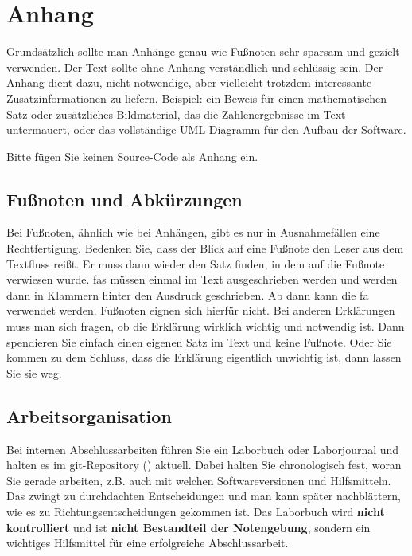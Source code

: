 
\appendix
\chapter{Anhang}
\label{anhang}

Grundsätzlich sollte man Anhänge genau wie Fußnoten sehr sparsam und gezielt verwenden.
Der Text sollte ohne Anhang verständlich und schlüssig sein.
Der Anhang dient dazu, nicht notwendige, aber vielleicht trotzdem interessante Zusatzinformationen zu liefern.
Beispiel: ein Beweis für einen mathematischen Satz oder zusätzliches Bildmaterial, das die Zahlenergebnisse im Text untermauert, oder das vollständige UML-Diagramm für den Aufbau der Software.

Bitte fügen Sie keinen Source-Code als Anhang ein.

\section{Fußnoten und Abkürzungen}

Bei Fußnoten, ähnlich wie bei Anhängen, gibt es nur in Ausnahmefällen eine Rechtfertigung.
Bedenken Sie, dass der Blick auf eine Fußnote den Leser aus dem Textfluss reißt.
Er muss dann wieder den Satz finden, in dem auf die Fußnote verwiesen wurde. \Acp{fa} müssen einmal im Text ausgeschrieben werden und werden dann in Klammern hinter den Ausdruck geschrieben.
Ab dann kann die \ac{fa} verwendet werden. Fußnoten eignen sich hierfür nicht.
Bei anderen Erklärungen muss man sich fragen, ob die Erklärung wirklich wichtig und notwendig ist.
Dann spendieren Sie einfach einen eigenen Satz im Text und keine Fußnote.
Oder Sie kommen zu dem Schluss, dass die Erklärung eigentlich unwichtig ist, dann lassen Sie sie weg.

\section{Arbeitsorganisation}

Bei internen Abschlussarbeiten führen Sie ein Laborbuch oder Laborjournal und halten es im git-Repository () aktuell.
Dabei halten Sie chronologisch fest, woran Sie gerade arbeiten, z.B. auch mit welchen Softwareversionen und Hilfsmitteln.
Das zwingt zu durchdachten Entscheidungen und man kann später nachblättern, wie es zu Richtungsentscheidungen gekommen ist.
Das Laborbuch wird \textbf{nicht kontrolliert} und ist \textbf{nicht Bestandteil der Notengebung}, sondern ein wichtiges Hilfsmittel für eine erfolgreiche Abschlussarbeit.
